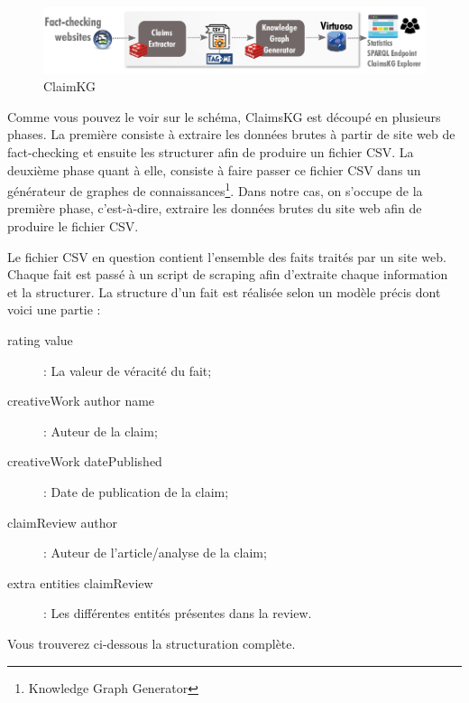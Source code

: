 \documentclass[oneside,13pt,a4paper]{report}
\begin{document}
\begin{figure}[h]
	\centering
	\begin{minipage}[c]{.95\linewidth}
		\includegraphics[width=1\textwidth]{img/claim.png}
		\caption{ClaimKG}
	\end{minipage}
\end{figure}

Comme vous pouvez le voir sur le schéma, ClaimsKG est découpé en plusieurs phases. La première consiste à extraire les données brutes à partir de site web de fact-checking et ensuite les structurer afin de produire un fichier CSV. La deuxième phase quant à elle, consiste à faire passer ce fichier CSV dans un générateur de graphes de connaissances\footnote{Knowledge Graph Generator}. Dans notre cas, on s'occupe de la première phase, c'est-à-dire, extraire les données brutes du site web afin de produire le fichier CSV.

Le fichier CSV en question contient l'ensemble des faits traités par un site web. Chaque fait est passé à un script de scraping afin d'extraite chaque information et la structurer. La structure d'un fait est réalisée selon un modèle précis dont voici une partie :

\begin{description}
	\item[rating value] : La valeur de véracité du fait;
	\item[creativeWork author name] : Auteur de la claim;
	\item[creativeWork datePublished] : Date de publication de la claim;
	\item[claimReview author] : Auteur de l'article/analyse de la claim;
	\item[extra entities claimReview] : Les différentes entités présentes dans la review.
\end{description}

Vous trouverez ci-dessous la structuration complète.
\end{document}
